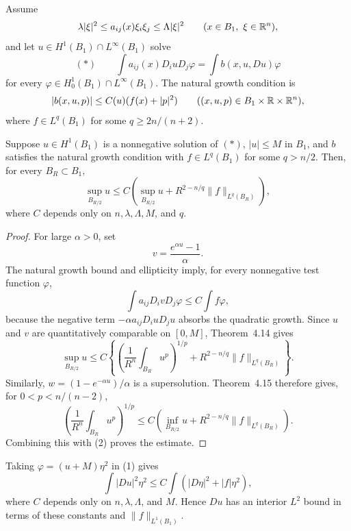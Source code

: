 Assume
\[
\lambda|\xi|^2\leq a_{ij}(x)\xi_i\xi_j\leq\Lambda|\xi|^2
\qquad(x\in B_1,\ \xi\in\mathbb{R}^n),
\]
and let $u\in H^1(B_1)\cap L^\infty(B_1)$ solve
\[
(\ast)\qquad
\int a_{ij}(x)D_i uD_j\varphi
=\int b(x,u,Du)\varphi
\]
for every $\varphi\in H^1_0(B_1)\cap L^\infty(B_1)$. The natural growth
condition is
\[
|b(x,u,p)|\leq C(u)(f(x)+|p|^2)
\qquad((x,u,p)\in B_1\times\mathbb{R}\times\mathbb{R}^n),
\]
where $f\in L^q(B_1)$ for some $q\geq2n/(n+2)$.

\begin{lemma}\label{hanlin:weaksol-part2-nonlinear-harnack}
Suppose $u\in H^1(B_1)$ is a nonnegative solution of $(\ast)$,
$|u|\leq M$ in $B_1$, and $b$ satisfies the natural growth condition with
$f\in L^q(B_1)$ for some $q>n/2$. Then, for every $B_R\subset B_1$,
\[
\sup_{B_{R/2}}u
\leq C\left(\sup_{B_{R/2}}u
+R^{2-n/q}\|f\|_{L^q(B_R)}\right),
\]
where $C$ depends only on $n,\lambda,\Lambda,M$, and $q$.
\end{lemma}
\begin{proof}
\sketch For large $\alpha>0$, set
\[
v=\frac{e^{\alpha u}-1}{\alpha}.
\]
The natural growth bound and ellipticity imply, for every nonnegative test
function $\varphi$,
\[
\int a_{ij}D_i vD_j\varphi\leq C\int f\varphi,
\tag{1}
\]
because the negative term
$-\alpha a_{ij}D_i uD_j u$ absorbs the quadratic growth. Since $u$ and $v$
are quantitatively comparable on $[0,M]$, Theorem~4.14 gives
\[
\sup_{B_{R/2}}u
\leq C\left\{
\left(\frac1{R^n}\int_{B_R}u^p\right)^{1/p}
+R^{2-n/q}\|f\|_{L^q(B_R)}\right\}.
\tag{2}
\]
Similarly, $w=(1-e^{-\alpha u})/\alpha$ is a supersolution. Theorem~4.15
therefore gives, for $0<p<n/(n-2)$,
\[
\left(\frac1{R^n}\int_{B_R}u^p\right)^{1/p}
\leq C\left(
\inf_{B_{R/2}}u+R^{2-n/q}\|f\|_{L^q(B_R)}\right).
\]
Combining this with (2) proves the estimate.
\end{proof}

\begin{remark}\label{hanlin:weaksol-part2-nonlinear-gradient-estimate}
Taking $\varphi=(u+M)\eta^2$ in (1) gives
\[
\int|Du|^2\eta^2
\leq C\int(|D\eta|^2+|f|\eta^2),
\]
where $C$ depends only on $n,\lambda,\Lambda$, and $M$. Hence $Du$ has an
interior $L^2$ bound in terms of these constants and
$\|f\|_{L^1(B_1)}$.
\end{remark}

